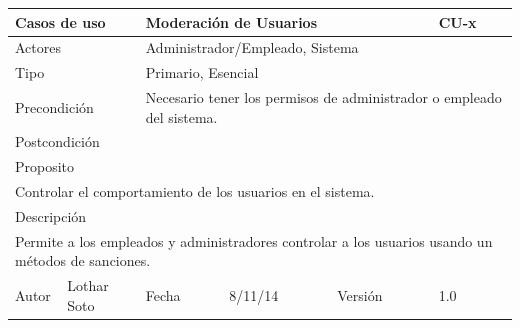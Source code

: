 \documentclass{article}
\begin{document}
\begin{table}[h]
\begin{tabular}{|l|l|l|l|l|l|}
\hline
\multicolumn{2}{|p{2cm}|}{Casos de uso}  & \multicolumn{3}{p{7cm}|}{Moderación de Usuarios} & CU-x \\
\hline
\multicolumn{2}{|p{2cm}|}{Actores}       & \multicolumn{4}{p{8cm}|}{Administrador/Empleado, Sistema}        \\
\hline
\multicolumn{2}{|p{2cm}|}{Tipo}          & \multicolumn{4}{p{8cm}|}{Primario, Esencial}        \\
\hline
\multicolumn{2}{|p{2cm}|}{Precondición}  & \multicolumn{4}{p{8cm}|}{Necesario tener los permisos de administrador o empleado del sistema.}        \\
\hline
\multicolumn{2}{|p{2cm}|}{Postcondición} & \multicolumn{4}{p{8cm}|}{}        \\
\hline
\multicolumn{6}{|p{10cm}|}{Proposito}                                   \\
\hline
\multicolumn{6}{|p{10cm}|}{Controlar el comportamiento de los usuarios en el sistema.}                                            \\
\hline
\multicolumn{6}{|p{10cm}|}{Descripción}                                 \\
\hline
\multicolumn{6}{|p{10cm}|}{Permite a los empleados y administradores controlar a los usuarios usando un métodos de sanciones.}                                            \\
\hline
Autor          &       Lothar Soto        & Fecha    &  8/11/14   &   Versión  & 1.0\\    
\hline
\end{tabular}
\end{table}


\end{document}
